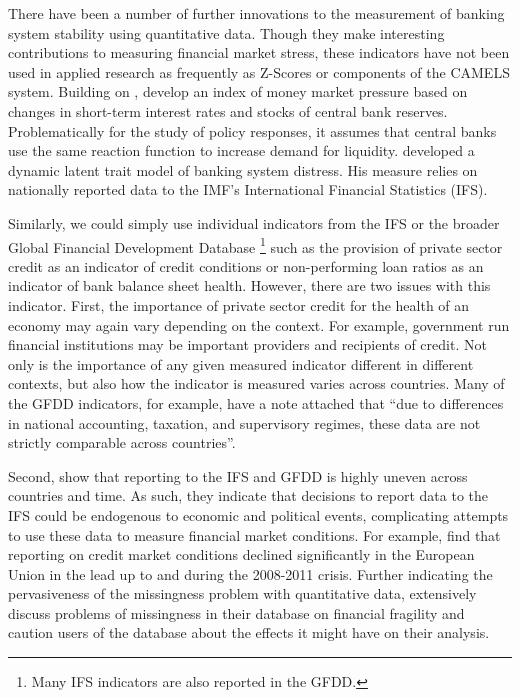 \documentclass[]{article}
\begin{document}
There have been a number of further innovations to the measurement of banking system stability using quantitative data. Though they make interesting contributions to measuring financial market stress, these indicators have not been used in applied research as frequently as Z-Scores or components of the CAMELS system. Building on \cite{vonHagen2007}, \cite{Jing2015} develop an index of money market pressure based on changes in short-term interest rates and stocks of central bank reserves. Problematically for the study of policy responses, it assumes that central banks use the same reaction function to increase demand for liquidity. \cite{Rosas2009dltm} developed a dynamic latent trait model of banking system distress. His measure relies on nationally reported data to the IMF's International Financial Statistics (IFS).

Similarly, we could simply use individual indicators from the IFS or the broader Global Financial Development Database \citep[GFDD,][]{worldbank2015}\footnote{Many IFS indicators are also reported in the GFDD.} such as the provision of private sector credit as an indicator of credit conditions or non-performing loan ratios as an indicator of bank balance sheet health. However, there are two issues with this indicator. First, the importance of private sector credit for the health of an economy may again vary depending on the context. For example, government run financial institutions may be important providers and recipients of credit. Not only is the importance of any given measured indicator different in different contexts, but also how the indicator is measured varies across countries. Many of the GFDD indicators, for example, have a note attached that ``due to differences in national accounting, taxation, and supervisory regimes, these data are not strictly comparable across countries''.

Second, \cite{GandrudCopHal2015} show that reporting to the IFS and GFDD is highly uneven across countries and time. As such, they indicate that decisions to report data to the IFS could be endogenous to economic and political events, complicating attempts to use these data to measure financial market conditions. For example, \cite{cghBruegel2015} find that reporting on credit market conditions declined significantly in the European Union in the lead up to and during the 2008-2011 crisis. Further indicating the pervasiveness of the missingness problem with quantitative data, \cite{Andrianova2015} extensively discuss problems of missingness in their database on financial fragility and caution users of the database about the effects it might have on their analysis.
\end{document}
